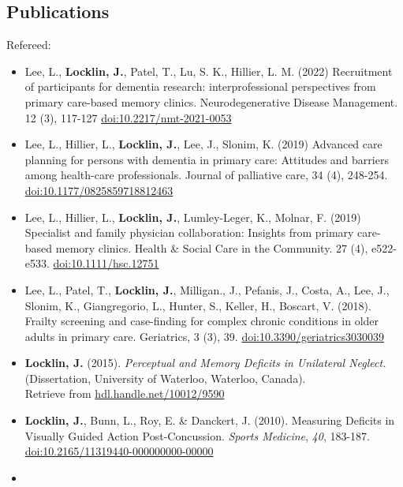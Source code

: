 \documentclass[10pt]{article}
\begin{document}
\subsection{Publications}\label{publications}

Refereed:

\begin{itemize}
\item
  Lee, L., \textbf{Locklin, J.}, Patel, T., Lu, S. K., Hillier, L. M.
  (2022) Recruitment of participants for dementia research:
  interprofessional perspectives from primary care-based memory clinics.
  Neurodegenerative Disease Management. 12 (3), 117-127
  \href{https://doi.org/10.2217/nmt-2021-0053}{doi:10.2217/nmt-2021-0053}
\item
  Lee, L., Hillier, L., \textbf{Locklin, J.}, Lee, J., Slonim, K. (2019)
  Advanced care planning for persons with dementia in primary care:
  Attitudes and barriers among health-care professionals. Journal of
  palliative care, 34 (4), 248-254.
  \href{https://doi.org/10.1177/0825859718812463}{doi:10.1177/0825859718812463}
\item
  Lee, L., Hillier, L., \textbf{Locklin, J.}, Lumley-Leger, K., Molnar,
  F. (2019) Specialist and family physician collaboration: Insights from
  primary care-based memory clinics. Health \& Social Care in the
  Community. 27 (4), e522-e533.
  \href{https://doi.org/10.1111/hsc.12751}{doi:10.1111/hsc.12751}
\item
  Lee, L., Patel, T., \textbf{Locklin, J.}, Milligan., J., Pefanis, J.,
  Costa, A., Lee, J., Slonim, K., Giangregorio, L., Hunter, S., Keller,
  H., Boscart, V. (2018). Frailty screening and case-finding for complex
  chronic conditions in older adults in primary care. Geriatrics, 3 (3),
  39.
  \href{http://dx.doi.org/10.3390/geriatrics3030039}{doi:10.3390/geriatrics3030039}
\item
  \textbf{Locklin, J.} (2015). \emph{Perceptual and Memory Deficits in
  Unilateral Neglect.} (Dissertation, University of Waterloo, Waterloo,
  Canada).\\
  Retrieve from
  \href{http://hdl.handle.net/10012/9590}{hdl.handle.net/10012/9590}
\item
  \textbf{Locklin, J.}, Bunn, L., Roy, E. \& Danckert, J. (2010).
  Measuring Deficits in Visually Guided Action Post-Concussion.
  \emph{Sports Medicine}, \emph{40}, 183-187.\\
  \href{http://dx.doi.org/10.2165/11319440-000000000-00000}{doi:10.2165/11319440-000000000-00000}
\item

\end{itemize}
\end{document}
